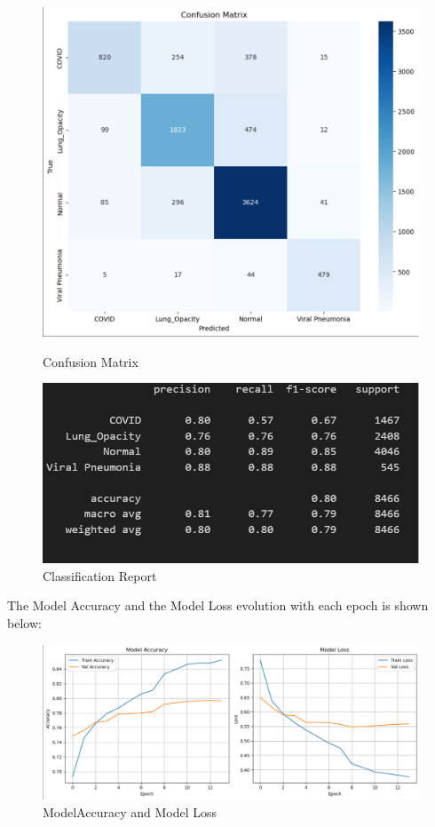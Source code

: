 \documentclass{article}
\begin{document}
\begin{figure}[H]
    \centering
    \begin{minipage}[t]{0.48\textwidth}
        \centering
        \includegraphics[width=\linewidth]{DN121cmsmall.png}
        \caption{Confusion Matrix}
        \label{fig:DN121cmsmall}
    \end{minipage}
    \hfill
    \begin{minipage}[t]{0.48\textwidth}
        \centering
        \includegraphics[width=\linewidth]{DN121crsmall.png}
        \caption{Classification Report}
        \label{fig:DN121crsmall}
    \end{minipage}
\end{figure}

The Model Accuracy and the Model Loss evolution with each epoch is shown below:

\begin{figure}[H]
    \centering
    \includegraphics[width=0.8\linewidth]{DN121graphsmall.png}
    \caption{ModelAccuracy and Model Loss}
    \label{fig:DN121graphsmall}
\end{figure}
\end{document}
